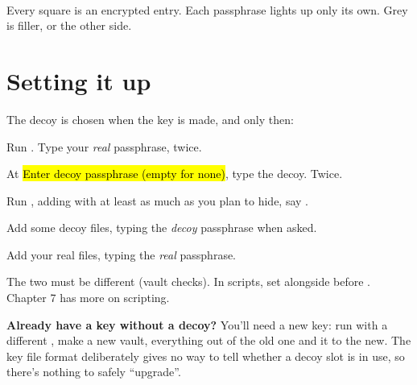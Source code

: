 \documentclass[10pt,oneside,openany]{book}
\begin{document}
\begin{center}
\\[2pt]
{\footnotesize\color{vslate}Every square is an encrypted entry. Each passphrase lights up only its own. Grey is filler, or the other side.}
\end{center}

\section{Setting it up}

The decoy is chosen when the key is made, and only then:

\begin{steps}
  \item Run . Type your \emph{real} passphrase, twice.
  \item At \hl{Enter decoy passphrase (empty for none)}, type the decoy. Twice.
  \item Run , adding  with at least as much as
        you plan to hide, say .
  \item Add some decoy files, typing the \emph{decoy} passphrase when asked.
  \item Add your real files, typing the \emph{real} passphrase.
\end{steps}

The two must be different (vault checks). In scripts, set
 alongside  before
. Chapter 7 has more on scripting.

\begin{headsup}
\textbf{Already have a key without a decoy?} You'll need a new key: run
 with a different , make a new vault, 
everything out of the old one and  it to the new. The key file
format deliberately gives no way to tell whether a decoy slot is in use, so
there's nothing to safely ``upgrade''.
\end{headsup}
\end{document}

